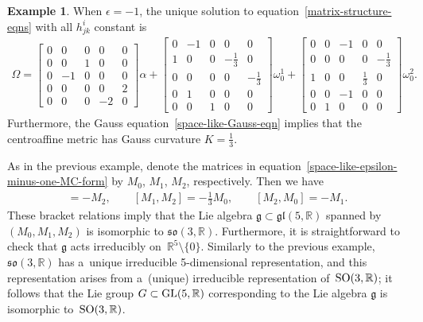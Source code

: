 \documentclass[pdftex]{sigma}
\numberwithin{equation}{section}
\theoremstyle{definition}
\newtheorem{exmpl}[teo]{Example}
\begin{document}
\begin{exmpl}
\label{space-like-epsilon-minus-one}
When $\epsilon=-1$, the unique solution to equation~\eqref{matrix-structure-eqns} with all $h^i_{jk}$ constant is
\begin{gather}
\Omega =
\begin{bmatrix}
0 & 0 & 0 & 0 & 0
\\
0 & 0 & 1 & 0 & 0
\\
0 & -1 & 0 & 0 & 0
\\
0 & 0 & 0 & 0 & 2
\\
0 & 0 & 0 & -2 & 0
\end{bmatrix}
\alpha +
\begin{bmatrix}
0 & -1 & 0 & 0 & 0
\\
1 & 0 & 0 & -\tfrac{1}{3} & 0
\\
0 & 0 & 0 & 0 & -\tfrac{1}{3}
\\
0 & 1 & 0 & 0 & 0
\\
0 & 0 & 1 & 0 & 0
\end{bmatrix}
\omega^1_0 +
\begin{bmatrix}
0 & 0 & -1 & 0 & 0
\\
0 & 0 & 0 & 0 & -\tfrac{1}{3}
\\
1 & 0 & 0 & \tfrac{1}{3} & 0
\\
0 & 0 & -1 & 0 & 0
\\
0 & 1 & 0 & 0 & 0
\end{bmatrix}
\omega^2_0.
\label{space-like-epsilon-minus-one-MC-form}
\end{gather}
Furthermore, the Gauss equation~\eqref{space-like-Gauss-eqn} implies that the centroaf\/f\/ine metric has Gauss curvature $K
= \tfrac{1}{3}$.

As in the previous example, denote the matrices in equation~\eqref{space-like-epsilon-minus-one-MC-form} by $M_0$, $M_1$, $M_2$, respectively.
Then we have
\begin{gather*}
[M_0, M_1] = -M_2,
\qquad
[M_1, M_2] = -\tfrac{1}{3} M_0,
\qquad
[M_2, M_0] = -M_1.
\end{gather*}
These bracket relations imply that the Lie algebra $\mathfrak{g} \subset \mathfrak{gl}(5,\mathbb{R})$ spanned by $(M_0,
M_1, M_2)$ is isomorphic to $\mathfrak{so}(3,\mathbb{R})$.
Furthermore, it is straightforward to check that $\mathfrak{g}$ acts irreducibly on~$\mathbb{R}^5 \setminus \{0 \}$.
Similarly to the previous example, $\mathfrak{so}(3,\mathbb{R})$ has a~unique irreducible 5-dimensional representation,
and this representation arises from a~(unique) irreducible representation of~${\rm SO}(3,\mathbb{R})$; it follows that
the Lie group $G \subset {\rm GL}(5,\mathbb{R})$ corresponding to the Lie algebra $\mathfrak{g}$ is isomorphic to~${\rm
SO}(3,\mathbb{R})$.


\end{exmpl}
\end{document}
